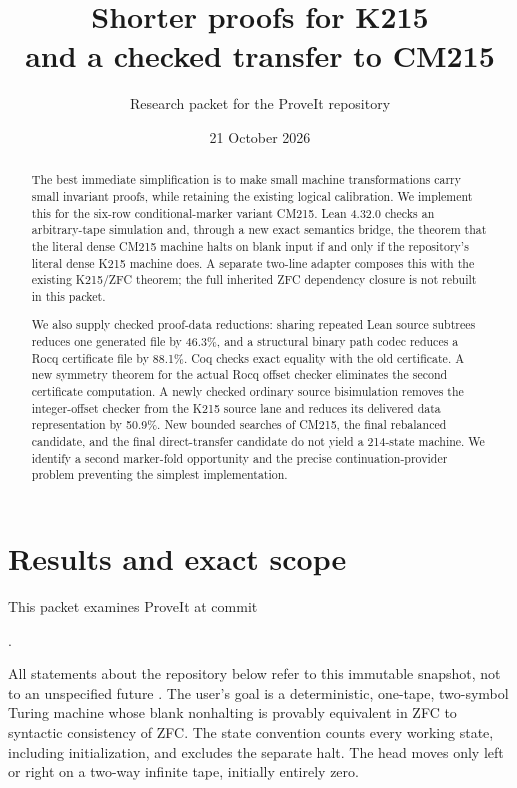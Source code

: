 \documentclass[11pt]{article}
\title{Shorter proofs for K215\\and a checked transfer to CM215}
\author{Research packet for the ProveIt repository}
\date{21 October 2026}
\newcommand{\code}[1]{\texttt{\detokenize{#1}}}
\begin{document}
\maketitle
\begin{abstract}
The best immediate simplification is to make small machine transformations carry small invariant proofs, while retaining the existing logical calibration. We implement this for the six-row conditional-marker variant CM215. Lean 4.32.0 checks an arbitrary-tape simulation and, through a new exact semantics bridge, the theorem that the literal dense CM215 machine halts on blank input if and only if the repository's literal dense K215 machine does. A separate two-line adapter composes this with the existing K215/ZFC theorem; the full inherited ZFC dependency closure is not rebuilt in this packet.

We also supply checked proof-data reductions: sharing repeated Lean source subtrees reduces one generated file by 46.3\%, and a structural binary path codec reduces a Rocq certificate file by 88.1\%. Coq checks exact equality with the old certificate. A new symmetry theorem for the actual Rocq offset checker eliminates the second certificate computation. A newly checked ordinary source bisimulation removes the integer-offset checker from the K215 source lane and reduces its delivered data representation by 50.9\%. New bounded searches of CM215, the final rebalanced candidate, and the final direct-transfer candidate do not yield a 214-state machine. We identify a second marker-fold opportunity and the precise continuation-provider problem preventing the simplest implementation.
\end{abstract}

\section{Results and exact scope}

This packet examines ProveIt at commit
\begin{center}\small{}.\end{center}
All statements about the repository below refer to this immutable snapshot, not to an unspecified future \code{main}. The user's goal is a deterministic, one-tape, two-symbol Turing machine whose blank nonhalting is provably equivalent in ZFC to syntactic consistency of ZFC. The state convention counts every working state, including initialization, and excludes the separate halt. The head moves only left or right on a two-way infinite tape, initially entirely zero.
\end{document}
